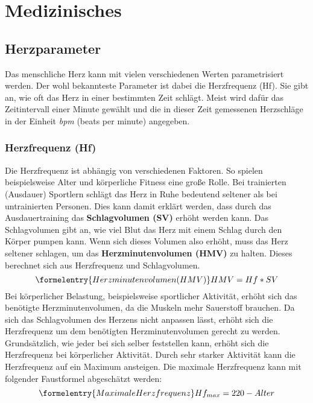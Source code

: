
\chapter{Medizinisches}

\section{Herzparameter}
Das menschliche Herz kann mit vielen verschiedenen Werten parametrisiert werden. Der wohl bekannteste Parameter ist dabei die Herzfrequenz (Hf). Sie gibt an, wie oft das Herz in einer bestimmten Zeit schlägt. Meist wird dafür das Zeitintervall einer Minute gewählt und die in dieser Zeit gemessenen Herzschläge in der Einheit \emph{bpm} (beats per minute) angegeben. 
\subsection{Herzfrequenz (Hf)} \label {subsec:hf}
Die Herzfrequenz ist abhängig von verschiedenen Faktoren. So spielen beispielsweise Alter und körperliche Fitness eine große Rolle. Bei trainierten (Ausdauer) Sportlern schlägt das Herz in Ruhe bedeutend seltener als bei untrainierten Personen. Dies kann damit erklärt werden, dass durch das Ausdauertraining das \textbf{Schlagvolumen (SV)} erhöht werden kann. Das Schlagvolumen gibt an, wie viel Blut das Herz mit einem Schlag durch den Körper pumpen kann. Wenn sich dieses Volumen also erhöht, muss das Herz seltener schlagen, um das \textbf{Herzminutenvolumen (HMV)} zu halten. Dieses berechnet sich aus Herzfrequenz und Schlagvolumen. \cite{herz} 
\begin{equation}\formelentry{Herzminutenvolumen (HMV)}
	HMV = Hf * SV
\end{equation} 
Bei körperlicher Belastung, beispielsweise sportlicher Aktivität, erhöht sich das benötigte Herzminutenvolumen, da die Muskeln mehr Sauerstoff brauchen. Da sich das Schlagvolumen des Herzens nicht anpassen lässt, erhöht sich die Herzfrequenz um dem benötigten Herzminutenvolumen gerecht zu werden. Grundsätzlich, wie jeder bei sich selber feststellen kann, erhöht sich die Herzfrequenz bei körperlicher Aktivität. Durch sehr starker Aktivität kann die Herzfrequenz auf ein Maximum ansteigen. Die maximale Herzfrequenz kann mit folgender Faustformel abgeschätzt werden: 
\begin{equation}\formelentry{Maximale Herzfrequenz}
	Hf_{max} = 220 - Alter
\end{equation}
